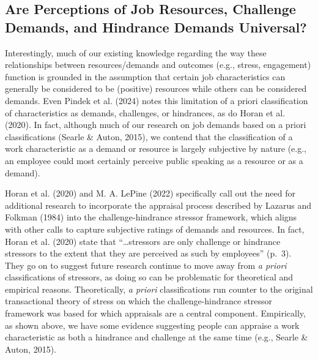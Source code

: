 \documentclass[
  man,mask]{apa7}
\begin{document}
\hypertarget{are-perceptions-of-job-resources-challenge-demands-and-hindrance-demands-universal}{%
\subsection{Are Perceptions of Job Resources, Challenge Demands, and Hindrance Demands Universal?}\label{are-perceptions-of-job-resources-challenge-demands-and-hindrance-demands-universal}}

Interestingly, much of our existing knowledge regarding the way these relationships between resources/demands and outcomes (e.g., stress, engagement) function is grounded in the assumption that certain job characteristics can generally be considered to be (positive) resources while others can be considered demands. Even Pindek et al. (2024) notes this limitation of a priori classification of characteristics as demands, challenges, or hindrances, as do Horan et al. (2020). In fact, although much of our research on job demands based on a priori classifications (Searle \& Auton, 2015), we contend that the classification of a work characteristic as a demand or resource is largely subjective by nature (e.g., an employee could most certainly perceive public speaking as a resource or as a demand).

Horan et al. (2020) and M. A. LePine (2022) specifically call out the need for additional research to incorporate the appraisal process described by Lazarus and Folkman (1984) into the challenge-hindrance stressor framework, which aligns with other calls to capture subjective ratings of demands and resources. In fact, Horan et al. (2020) state that ``\ldots stressors are only challenge or hindrance stressors to the extent that they are perceived as such by employees'' (p.~3). They go on to suggest future research continue to move away from \emph{a priori} classifications of stressors, as doing so can be problematic for theoretical and empirical reasons. Theoretically, \emph{a priori} classifications run counter to the original transactional theory of stress on which the challenge-hindrance stressor framework was based for which appraisals are a central component. Empirically, as shown above, we have some evidence suggesting people can appraise a work characteristic as both a hindrance and challenge at the same time (e.g., Searle \& Auton, 2015).
\end{document}
